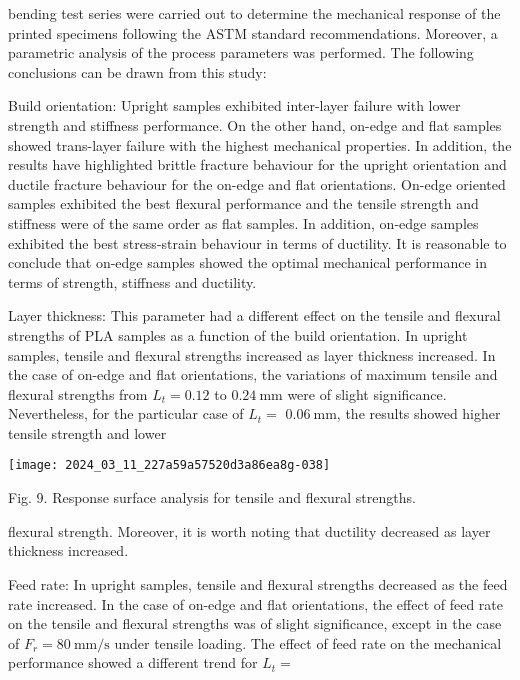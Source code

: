 \documentclass[10pt]{article}
\begin{document}
bending test series were carried out to determine the mechanical response of the printed specimens following the ASTM standard recommendations. Moreover, a parametric analysis of the process parameters was performed. The following conclusions can be drawn from this study:

Build orientation: Upright samples exhibited inter-layer failure with lower strength and stiffness performance. On the other hand, on-edge and flat samples showed trans-layer failure with the highest mechanical properties. In addition, the results have highlighted brittle fracture behaviour for the upright orientation and ductile fracture behaviour for the on-edge and flat orientations. On-edge oriented samples exhibited the best flexural performance and the tensile strength and stiffness were of the same order as flat samples. In addition, on-edge samples exhibited the best stress-strain behaviour in terms of ductility. It is reasonable to conclude that on-edge samples showed the optimal mechanical performance in terms of strength, stiffness and ductility.

Layer thickness: This parameter had a different effect on the tensile and flexural strengths of PLA samples as a function of the build orientation. In upright samples, tensile and flexural strengths increased as layer thickness increased. In the case of on-edge and flat orientations, the variations of maximum tensile and flexural strengths from $L_{t}=0.12$ to $0.24 \mathrm{~mm}$ were of slight significance. Nevertheless, for the particular case of $L_{t}=$ $0.06 \mathrm{~mm}$, the results showed higher tensile strength and lower

\begin{center}
\texttt{[image: 2024\_03\_11\_227a59a57520d3a86ea8g-038]}
\end{center}

Fig. 9. Response surface analysis for tensile and flexural strengths.

flexural strength. Moreover, it is worth noting that ductility decreased as layer thickness increased.

Feed rate: In upright samples, tensile and flexural strengths decreased as the feed rate increased. In the case of on-edge and flat orientations, the effect of feed rate on the tensile and flexural strengths was of slight significance, except in the case of $F_{r}=80 \mathrm{~mm} / \mathrm{s}$ under tensile loading. The effect of feed rate on the mechanical performance showed a different trend for $L_{t}=$
\end{document}

